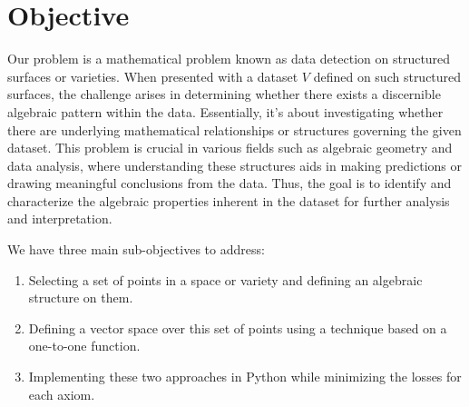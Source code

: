 \documentclass{article}
\begin{document}
\section{Objective}
\begin{frame}
Our problem is a mathematical problem known 
as data detection on structured surfaces or 
varieties. When presented with a dataset $V$ 
defined on such structured surfaces, the challenge 
arises in determining whether there exists a 
discernible algebraic pattern within the data. 
Essentially, it's about investigating whether 
there are underlying mathematical relationships 
or structures governing the given dataset. 
This problem is crucial in various fields 
such as algebraic geometry and data analysis, 
where understanding these structures aids in 
making predictions or drawing meaningful 
conclusions from the data. Thus, the goal 
is to identify and characterize the algebraic
 properties inherent in the dataset for further
  analysis and interpretation.\\



We have three main sub-objectives to address:

\begin{enumerate}
    \item Selecting a set of points in a space or variety and defining an algebraic structure on them.
    \item Defining a vector space over this set of points using a technique based on a one-to-one function.
    \item Implementing these two approaches in Python while minimizing the losses for each axiom.
\end{enumerate}



\end{frame}
\end{document}
